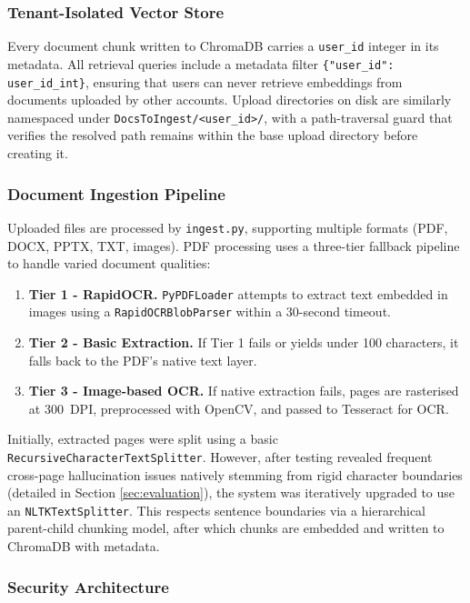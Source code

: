 \documentclass[11pt,a4paper]{article}
\begin{document}
\subsubsection{Tenant-Isolated Vector Store}

Every document chunk written to ChromaDB carries a \texttt{user\_id} integer in its
metadata.  All retrieval queries include a metadata filter \texttt{\{"user\_id": user\_id\_int\}},
ensuring that users can never retrieve embeddings from documents uploaded by other accounts.
Upload directories on disk are similarly namespaced under \texttt{DocsToIngest/<user\_id>/},
with a path-traversal guard that verifies the resolved path remains within the base upload
directory before creating it.

\subsubsection{Document Ingestion Pipeline}

Uploaded files are processed by \texttt{ingest.py}, supporting multiple formats (PDF, DOCX, PPTX, TXT, images). PDF processing uses a three-tier fallback pipeline to handle varied document qualities:

\begin{enumerate}
    \item \textbf{Tier 1 - RapidOCR.}  \texttt{PyPDFLoader} attempts to extract text embedded in images using a \texttt{RapidOCRBlobParser} within a 30-second timeout.
    \item \textbf{Tier 2 - Basic Extraction.}  If Tier 1 fails or yields under 100 characters, it falls back to the PDF's native text layer.
    \item \textbf{Tier 3 - Image-based OCR.}  If native extraction fails, pages are rasterised at 300~DPI, preprocessed with OpenCV, and passed to Tesseract for OCR.
\end{enumerate}

\noindent Initially, extracted pages were split using a basic \texttt{RecursiveCharacterTextSplitter}. However, after testing revealed frequent cross-page hallucination issues natively stemming from rigid character boundaries (detailed in Section \ref{sec:evaluation}), the system was iteratively upgraded to use an \texttt{NLTKTextSplitter}. This respects sentence boundaries via a hierarchical parent-child chunking model, after which chunks are embedded and written to ChromaDB with metadata.

\subsubsection{Security Architecture}
\end{document}
